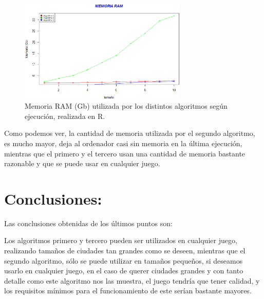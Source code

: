 \begin{figure}[h!]

	\centering
	\includegraphics[width=8cm]{./eps/memoria.eps}
	\caption{Memoria RAM (Gb) utilizada por los distintos algoritmos según ejecución, realizada en R.}
	\label{Figura12}

\end{figure}

Como podemos ver, la cantidad de memoria utilizada por el segundo algoritmo, es mucho mayor, deja al ordenador casi sin memoria en la última ejecución, mientras que el primero y el tercero usan una cantidad de memoria bastante razonable y que se puede usar en cualquier juego.


\section{Conclusiones:}

Las conclusiones obtenidas de los últimos puntos son:

Los algoritmos primero y tercero pueden ser utilizados en cualquier juego, realizando tamaños de ciudades tan grandes como se deseen, mientras que el segundo algoritmo, sólo se puede utilizar en tamaños pequeños, si deseamos usarlo en cualquier juego, en el caso de querer ciudades grandes y con tanto detalle como este algoritmo nos las muestra, el juego tendría que tener calidad, y los requisitos mínimos para el funcionamiento de este serían bastante mayores.

\newpage






